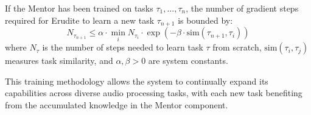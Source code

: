 \begin{theorem}
If the Mentor has been trained on tasks $\tau_1, \ldots, \tau_n$, the number of gradient steps required for Erudite to learn a new task $\tau_{n+1}$ is bounded by:
\begin{equation}
N_{\tau_{n+1}} \leq \alpha \cdot \min_i N_{\tau_i} \cdot \exp\left(-\beta \cdot \mathrm{sim}(\tau_{n+1}, \tau_i)\right)
\end{equation}
where $N_{\tau}$ is the number of steps needed to learn task $\tau$ from scratch, $\mathrm{sim}(\tau_i, \tau_j)$ measures task similarity, and $\alpha, \beta > 0$ are system constants.
\end{theorem}

This training methodology allows the system to continually expand its capabilities across diverse audio processing tasks, with each new task benefiting from the accumulated knowledge in the Mentor component.